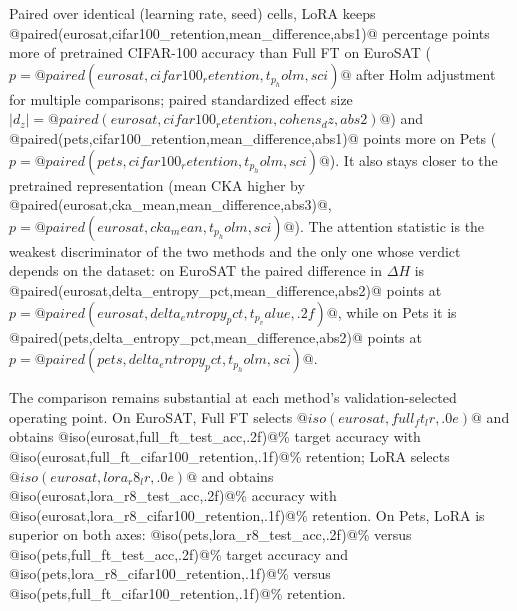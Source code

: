 \documentclass[conference]{IEEEtran}
\begin{document}
Paired over identical (learning rate, seed) cells, LoRA keeps @paired(eurosat,cifar100_retention,mean_difference,abs1)@ percentage points more of pretrained CIFAR-100 accuracy than Full FT on EuroSAT ($p=@paired(eurosat,cifar100_retention,t_p_holm,sci)@$ after Holm adjustment for multiple comparisons; paired standardized effect size $|d_z|=@paired(eurosat,cifar100_retention,cohens_dz,abs2)@$) and @paired(pets,cifar100_retention,mean_difference,abs1)@ points more on Pets ($p=@paired(pets,cifar100_retention,t_p_holm,sci)@$). It also stays closer to the pretrained representation (mean CKA higher by @paired(eurosat,cka_mean,mean_difference,abs3)@, $p=@paired(eurosat,cka_mean,t_p_holm,sci)@$). The attention statistic is the weakest discriminator of the two methods and the only one whose verdict depends on the dataset: on EuroSAT the paired difference in $\Delta H$ is @paired(eurosat,delta_entropy_pct,mean_difference,abs2)@ points at $p=@paired(eurosat,delta_entropy_pct,t_p_value,.2f)@$, while on Pets it is @paired(pets,delta_entropy_pct,mean_difference,abs2)@ points at $p=@paired(pets,delta_entropy_pct,t_p_holm,sci)@$.

The comparison remains substantial at each method's validation-selected operating point. On EuroSAT, Full FT selects $@iso(eurosat,full_ft_lr,.0e)@$ and obtains @iso(eurosat,full_ft_test_acc,.2f)@\% target accuracy with @iso(eurosat,full_ft_cifar100_retention,.1f)@\% retention; LoRA selects $@iso(eurosat,lora_r8_lr,.0e)@$ and obtains @iso(eurosat,lora_r8_test_acc,.2f)@\% accuracy with @iso(eurosat,lora_r8_cifar100_retention,.1f)@\% retention. On Pets, LoRA is superior on both axes: @iso(pets,lora_r8_test_acc,.2f)@\% versus @iso(pets,full_ft_test_acc,.2f)@\% target accuracy and @iso(pets,lora_r8_cifar100_retention,.1f)@\% versus @iso(pets,full_ft_cifar100_retention,.1f)@\% retention.
\end{document}
